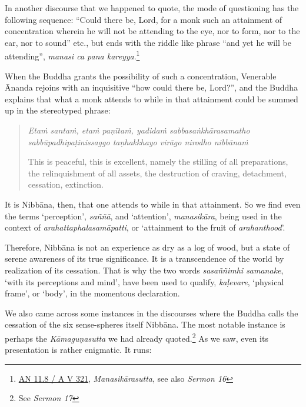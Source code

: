 In another discourse that we happened to quote, the mode of questioning has the following sequence: ``Could there be, Lord, for a monk such an attainment of concentration wherein he will not be attending to the eye, nor to form, nor to the ear, nor to sound'' etc., but ends with the riddle like phrase ``and yet he will be attending'', \emph{manasi ca pana kareyya}.\footnote{\href{https://suttacentral.net/an11.8/pli/ms}{AN 11.8 / A V 321}, \emph{Manasikārasutta}, see also \emph{Sermon 16}}

When the Buddha grants the possibility of such a concentration, Venerable Ānanda rejoins with an inquisitive ``how could there be, Lord?'', and the Buddha explains that what a monk attends to while in that attainment could be summed up in the stereotyped phrase:

\begin{quote}
\emph{Etaṁ santaṁ, etaṁ paṇītaṁ, yadidaṁ sabbasaṅkhārasamatho sabbūpadhipaṭinissaggo taṇhakkhayo virāgo nirodho nibbānaṁ}

This is peaceful, this is excellent, namely the stilling of all preparations, the relinquishment of all assets, the destruction of craving, detachment, cessation, extinction.
\end{quote}

It is Nibbāna, then, that one attends to while in that attainment. So we find even the terms `perception', \emph{saññā}, and `attention', \emph{manasikāra}, being used in the context of \emph{arahattaphalasamāpatti}, or `attainment to the fruit of \emph{arahanthood}'.

Therefore, Nibbāna is not an experience as dry as a log of wood, but a state of serene awareness of its true significance. It is a transcendence of the world by realization of its cessation. That is why the two words \emph{sasaññimhi samanake}, `with its perceptions and mind', have been used to qualify, \emph{kaḷevare}, `physical frame', or `body', in the momentous declaration.

We also came across some instances in the discourses where the Buddha calls the cessation of the six sense-spheres itself Nibbāna. The most notable instance is perhaps the \emph{Kāmaguṇasutta} we had already quoted.\footnote{See \emph{Sermon 17}} As we saw, even its presentation is rather enigmatic. It runs:

